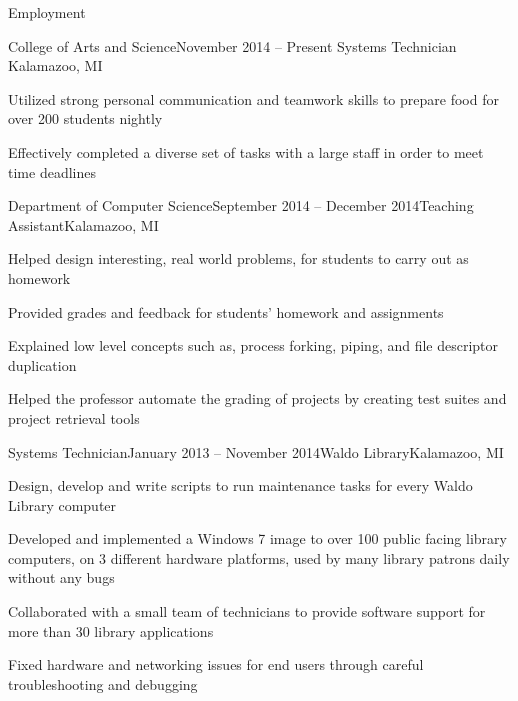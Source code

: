 \documentclass{resume} %
\begin{document}
\begin{rSection}{Employment}


\begin{rSubsection}{College of Arts and Science}{November 2014 -- Present}{ Systems Technician }{Kalamazoo, MI}

\item Utilized strong personal communication and teamwork skills to prepare food for over 200 students nightly
\item Effectively completed a diverse set of tasks with a large staff in order to meet time deadlines

\end{rSubsection}

\begin{rSubsection}{Department of Computer Science}{September 2014 -- December 2014}{Teaching Assistant}{Kalamazoo, MI}

\item Helped design interesting, real world problems, for students to carry out as homework
\item Provided grades and feedback for students’ homework and assignments
\item Explained low level concepts such as, process forking, piping, and file descriptor duplication
\item Helped the professor automate the grading of projects by creating test suites and project retrieval tools

\end{rSubsection}


\begin{rSubsection}{Systems Technician}{January 2013 -- November 2014}{Waldo Library}{Kalamazoo, MI}

\item Design, develop and write scripts to run maintenance tasks for every Waldo Library computer
\item Developed and implemented a Windows 7 image to over 100 public facing library computers, on 3 different hardware platforms, used by many library patrons daily without any bugs
\item Collaborated with a small team of technicians to provide software support for more than 30 library applications
\item Fixed hardware and networking issues for end users through careful troubleshooting and debugging



\end{rSubsection}




\end{rSection}
\end{document}
